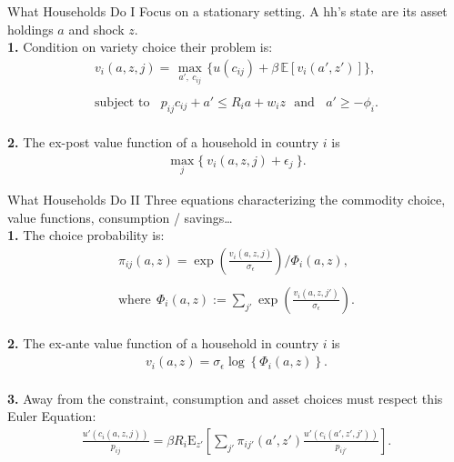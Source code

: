 \documentclass[9pt,pdftex,aspectratio=1610]{beamer}
\theoremstyle{definition}
\begin{document}
\begin{frame}[t]{What Households Do I}
\smallskip
Focus on a stationary setting. A hh's state are its asset holdings $a$ and shock $z$.\\
\textbf{1.} Condition on variety choice their problem is:
\begin{align}
v_{i}(a, z, j) =   \max_{\ a', \ c_{ij}  \ }\bigg  \{ u(c_{ij})  + \beta \, \mathbb{E} [v_{i}(a', z')]  \bigg\}, \nonumber \\
\nonumber \\
\mbox{subject to}  \ \ \  \  p_{ij}c_{ij} +  a' \leq    R_{i} a + w_{i} z \ \ \  \mbox{and} \ \ \ \ a' \geq - \phi_{i}. \nonumber
\end{align}\\
\bigskip
\textbf{2.} The ex-post value function of a household in country $i$ is
\begin{align}
\max_{j} \big  \{ \  v_{i}(a, z, j) + \epsilon_{j}  \ \big \}. \nonumber
\end{align}
\end{frame}


\begin{frame}[t]{What Households Do II}
\smallskip
Three equations characterizing the commodity choice, value functions, consumption / savings\ldots\\
\textbf{1.} The choice probability is:
\begin{align*}
\pi_{ij}(a, z) = \exp \left( \frac{ v_{i}(a, z, j) }{\sigma_{\epsilon}} \right) \Bigg / \Phi_{i}(a,z) ,\\
\\
\mbox{where} \ \ \Phi_{i}(a,z) := \sum_{j'} \exp \left( \frac{ v_{i}(a, z, j') }{\sigma_{\epsilon}}  \right).
\end{align*}\\
\bigskip
\textbf{2.} The ex-ante value function of a household in country $i$ is
\begin{align*}
v_i(a, z) = \sigma_{\epsilon} \log \left\{ \Phi_{i}(a,z)  \right\}. 
\end{align*}\\
\bigskip
\textbf{3.} Away from the constraint, consumption and asset choices must respect this Euler Equation:
\begin{align*}
\frac{u'(c_{i}(a, z, j))}{p_{ij}} = \beta R_{i} \mathrm{E}_{z'} \left[ \sum_{j'} \pi_{ij'}(a', z') \frac{u'(c_{i}(a', z', j'))}{p_{ij'}} \right].
\end{align*}
\end{frame}
\end{document}
